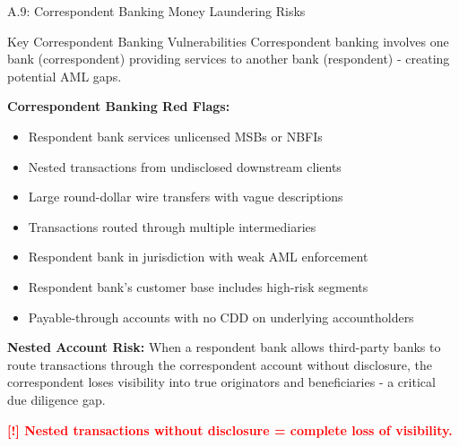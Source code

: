 \documentclass[11pt,a4paper]{beamer}
\newcommand{\redflag}[1]{\textcolor{red}{\textbf{[!] #1}}}
\begin{document}
	\begin{frame}{A.9: Correspondent Banking Money Laundering Risks}
		\begin{block}{Key Correspondent Banking Vulnerabilities}
			Correspondent banking involves one bank (correspondent) providing services to another bank (respondent) - creating potential AML gaps.
		\end{block}
		\textbf{Correspondent Banking Red Flags:}
		\begin{itemize}
			\item Respondent bank services unlicensed MSBs or NBFIs
			\item Nested transactions from undisclosed downstream clients
			\item Large round-dollar wire transfers with vague descriptions
			\item Transactions routed through multiple intermediaries
			\item Respondent bank in jurisdiction with weak AML enforcement
			\item Respondent bank's customer base includes high-risk segments
			\item Payable-through accounts with no CDD on underlying accountholders
		\end{itemize}
		\textbf{Nested Account Risk:}
		When a respondent bank allows third-party banks to route transactions through the correspondent account without disclosure, the correspondent loses visibility into true originators and beneficiaries - a critical due diligence gap.
		
		\redflag{Nested transactions without disclosure = complete loss of visibility.}
	\end{frame}
	
\end{document}
